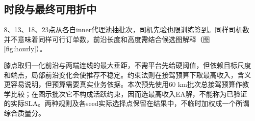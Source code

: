 \subsection{时段与最终可用折中}
8、13、18、23点从各自inner代理池抽批次，司机先验也限训练签到。同样司机数并不意味着同样可行订单数，前沿长度和高度需结合候选图解释（图\ref{fig:hourly}）。

膝点取归一化前沿与两端连线的最大垂距，不需平台先给硬阈值，但依赖目标尺度和端点，局部前沿变化会使推荐不稳定。约束法则在接驾预算下取最高收入，含义更容易说明，但预算需要真实业务依据。本次预先使用60 km批次总接驾预算作教学比较；在图示批次它不构成活跃约束，因而选最高收入EA解，不能称为已验证的实际SLA。两种规则及各seed实际选择点保留在结果中，不临时加权成一个所谓综合质量分。
